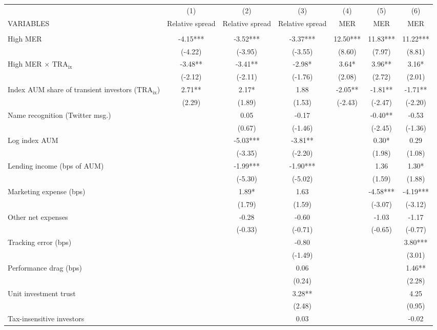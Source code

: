 \documentclass[]{article}
\begin{document}
\begin{tabular}{lcccccc} \hline
 & (1) & (2) & (3) & (4) & (5) & (6) \\
VARIABLES & Relative spread & Relative spread & Relative spread & MER & MER & MER \\ \hline
 &  &  &  &  &  &  \\
High MER & -4.15*** & -3.52*** & -3.37*** & 12.50*** & 11.83*** & 11.22*** \\
 & (-4.22) & (-3.95) & (-3.55) & (8.60) & (7.97) & (8.81) \\
High MER $\times$ $\text{TRA}_\text{ix}$ & -3.48** & -3.41** & -2.98* & 3.64* & 3.96** & 3.16* \\
 & (-2.12) & (-2.11) & (-1.76) & (2.08) & (2.72) & (2.01) \\
Index AUM share of transient investors ($\text{TRA}_\text{ix}$) & 2.71** & 2.17* & 1.88 & -2.05** & -1.81** & -1.71** \\
 & (2.29) & (1.89) & (1.53) & (-2.43) & (-2.47) & (-2.20) \\
Name recognition (Twitter msg.) &  & 0.05 & -0.17 &  & -0.40** & -0.53 \\
 &  & (0.67) & (-1.46) &  & (-2.45) & (-1.36) \\
Log index AUM &  & -5.03*** & -3.81** &  & 0.30* & 0.29 \\
 &  & (-3.35) & (-2.20) &  & (1.98) & (1.08) \\
Lending income (bps of AUM) &  & -1.99*** & -1.90*** &  & 1.36 & 1.30* \\
 &  & (-5.30) & (-5.02) &  & (1.59) & (1.88) \\
Marketing expense (bps) &  & 1.89* & 1.63 &  & -4.58*** & -4.19*** \\
 &  & (1.79) & (1.59) &  & (-3.07) & (-3.12) \\
Other net expenses &  & -0.28 & -0.60 &  & -1.03 & -1.17 \\
 &  & (-0.33) & (-0.71) &  & (-0.65) & (-0.77) \\
Tracking error (bps) &  &  & -0.80 &  &  & 3.80*** \\
 &  &  & (-1.49) &  &  & (3.01) \\
Performance drag (bps) &  &  & 0.06 &  &  & 1.46** \\
 &  &  & (0.24) &  &  & (2.28) \\
Unit investment trust &  &  & 3.28** &  &  & 4.25 \\
 &  &  & (2.48) &  &  & (0.95) \\
Tax-insensitive investors &  &  & 0.03 &  &  & -0.02 \\

\end{tabular}
\end{document}

